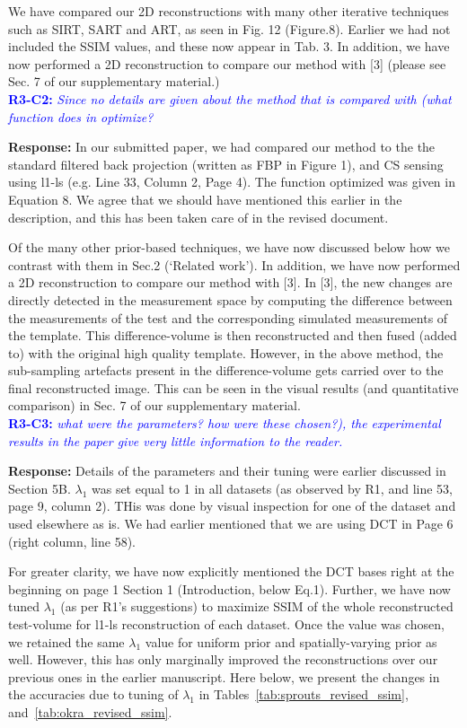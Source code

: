 \documentclass{article}
\begin{document}
We have compared our 2D reconstructions with many other iterative techniques such as SIRT, SART and ART, as seen in Fig. 12 (Figure.8). Earlier we had not included the SSIM values,  and these now appear in Tab. 3.  In addition, we have now performed a 2D reconstruction to compare our method with [3] (please see Sec. 7 of our supplementary material.)\\

\textcolor{blue}{\textbf{R3-C2:}\textit{ Since no details are given about the method that is compared with (what function does in optimize?}}

\textbf{ Response:} In our submitted paper, we had compared our method to the the standard filtered back projection (written as FBP in Figure 1), and CS sensing using l1-ls (e.g. Line 33, Column 2, Page 4). The function optimized was given in Equation 8. We agree that we should have mentioned this earlier in the description, and this has been taken care of in the revised document. 

Of the many other prior-based techniques, we have now discussed  below how we contrast with them in Sec.2 (`Related work'). In addition, we have now performed a 2D reconstruction to compare our method with [3]. In [3], the new changes are directly detected in the measurement space by computing the difference between the measurements of the test and the corresponding simulated measurements of the template. This difference-volume is then reconstructed and then fused (added to) with the original high quality template.
However, in the above method, the sub-sampling artefacts present in the difference-volume gets carried over to the final reconstructed image. This can be seen in the visual results (and quantitative comparison) in Sec. 7 of our supplementary material.\\


\textcolor{blue}{\textbf{R3-C3:}\textit{ what were the parameters? how were these chosen?), the experimental results in the paper give very little information to the reader.}}

\textbf{ Response:} Details of the parameters and their tuning were earlier discussed in Section 5B. $\lambda_1$ was set equal to 1 in all datasets (as observed by R1, and line 53, page 9, column 2).  THis was done by visual inspection for one of the dataset and used elsewhere as is. We had earlier mentioned that we are using DCT in Page 6 (right column, line 58). 

For greater clarity, we have now explicitly mentioned the DCT bases right at the beginning on page 1 Section 1 (Introduction, below Eq.1).  Further, we have now tuned $\lambda_1$ (as per R1's suggestions) to maximize SSIM of the whole reconstructed test-volume for l1-ls reconstruction of each dataset. Once the value was chosen, we retained the same $\lambda_1$ value for uniform prior and spatially-varying prior as well. However, this has only marginally improved the reconstructions over our previous ones in the earlier manuscript. Here below, we present the changes in the accuracies due to tuning of $\lambda_1$ in Tables~\ref{tab:sprouts_revised_ssim}, and~\ref{tab:okra_revised_ssim}.
\end{document}
